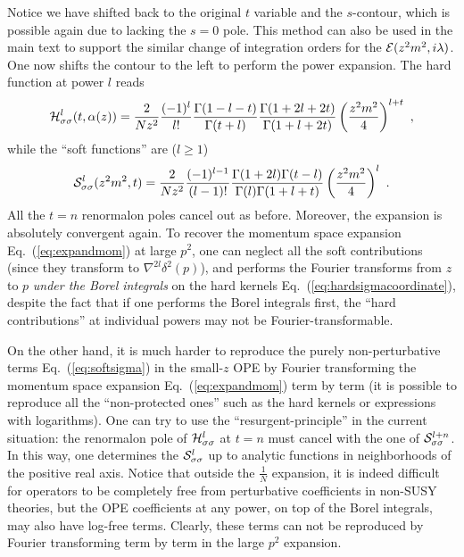 \documentclass[a4paper,11pt]{article}
\begin{document}
Notice we have shifted back to the original $t$ variable and the $s$-contour, which is possible again due to lacking the $s=0$ pole. This method can also be used in the main text to support the similar change of integration orders for the ${\cal E}(z^2m^2,i\lambda)$. One now shifts the contour to the left to perform the power expansion. The hard function at power $l$ reads 
\begin{align}\label{eq:hardsigmacoordinate}
{\cal H}_{\sigma\sigma}^{l}(t,\alpha(z))=\frac{2}{Nz^2}\frac{(-1)^l}{l!}\frac{\Gamma(1-l-t)}{\Gamma(t+l)}\frac{\Gamma(1+2l+2t)}{\Gamma(1+l+2t)}\left(\frac{z^2m^2}{4}\right)^{l+t} \ ,
\end{align}
while the ``soft functions'' are ($l\ge 1$)
\begin{align}\label{eq:softsigma}
{\cal S}_{\sigma\sigma}^{l}(z^2m^2,t)=\frac{2}{Nz^2}\frac{(-1)^{l-1}}{(l-1)!}\frac{\Gamma(1+2l)\Gamma(t-l)}{\Gamma(l)\Gamma(1+l+t)}\left(\frac{z^2m^2}{4}\right)^{l} \ .
\end{align}
All the $t=n$ renormalon poles cancel out as before. Moreover, the expansion is absolutely convergent again. To recover the momentum space expansion Eq.~(\ref{eq:expandmom}) at large $p^2$, one can neglect all the soft contributions (since they transform to $\nabla^{2l} \delta^2(p)$), and performs the Fourier transforms from $z$ to $p$ {\it under the Borel integrals} on the hard kernels Eq.~(\ref{eq:hardsigmacoordinate}), despite the fact that if one performs the Borel integrals first, the ``hard contributions'' at individual powers may not be Fourier-transformable. 

On the other hand, it is much harder to reproduce the purely non-perturbative terms Eq.~(\ref{eq:softsigma}) in the small-$z$ OPE by Fourier transforming the momentum space expansion Eq.~(\ref{eq:expandmom}) term by term (it is possible to reproduce all the ``non-protected ones'' such as the hard kernels or expressions with logarithms). One can try to use the ``resurgent-principle'' in the current situation: the renormalon pole of ${\cal H}_{\sigma\sigma}^{l}$ at $t=n$ must cancel with the one of ${\cal S}_{\sigma\sigma}^{l+n}$. In this way, one determines the ${\cal S}_{\sigma\sigma}^{l}$ up to analytic functions in neighborhoods of the positive real axis. Notice that outside the $\frac{1}{N}$ expansion, it is indeed difficult for operators to be completely free from perturbative coefficients in non-SUSY theories, but the OPE coefficients at any power, on top of the Borel integrals, may also have log-free terms. Clearly, these terms can not be reproduced by Fourier transforming term by term in the large $p^2$ expansion. 
 
\end{document}
